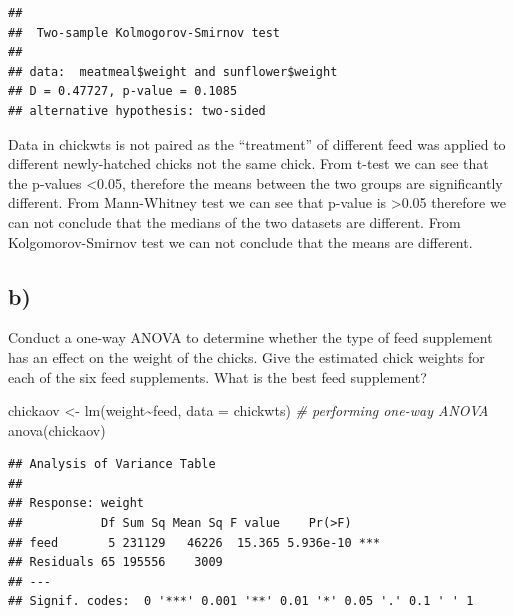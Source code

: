 \documentclass[
]{article}
\newenvironment{Shaded}{\begin{snugshade}}{\end{snugshade}}
\newcommand{\AttributeTok}[1]{\textcolor[rgb]{0.77,0.63,0.00}{#1}}
\newcommand{\CommentTok}[1]{\textcolor[rgb]{0.56,0.35,0.01}{\textit{#1}}}
\newcommand{\FunctionTok}[1]{\textcolor[rgb]{0.00,0.00,0.00}{#1}}
\newcommand{\NormalTok}[1]{#1}
\newcommand{\OtherTok}[1]{\textcolor[rgb]{0.56,0.35,0.01}{#1}}
\newcommand{\SpecialCharTok}[1]{\textcolor[rgb]{0.00,0.00,0.00}{#1}}
\newcommand{\StringTok}[1]{\textcolor[rgb]{0.31,0.60,0.02}{#1}}
\begin{document}
\begin{verbatim}
## 
##  Two-sample Kolmogorov-Smirnov test
## 
## data:  meatmeal$weight and sunflower$weight
## D = 0.47727, p-value = 0.1085
## alternative hypothesis: two-sided
\end{verbatim}

Data in chickwts is not paired as the ``treatment'' of different feed
was applied to different newly-hatched chicks not the same chick. From
t-test we can see that the p-values \textless0.05, therefore the means
between the two groups are significantly different. From Mann-Whitney
test we can see that p-value is \textgreater0.05 therefore we can not
conclude that the medians of the two datasets are different. From
Kolgomorov-Smirnov test we can not conclude that the means are
different.

\hypertarget{b-3}{%
\subsection{b)}\label{b-3}}

Conduct a one-way ANOVA to determine whether the type of feed supplement
has an effect on the weight of the chicks. Give the estimated chick
weights for each of the six feed supplements. What is the best feed
supplement?

\begin{Shaded}
\begin{Highlighting}[]
\NormalTok{chickaov }\OtherTok{\textless{}{-}} \FunctionTok{lm}\NormalTok{(weight}\SpecialCharTok{\textasciitilde{}}\NormalTok{feed, }\AttributeTok{data =}\NormalTok{ chickwts)}
\CommentTok{\# performing one{-}way ANOVA}
\FunctionTok{anova}\NormalTok{(chickaov)}
\end{Highlighting}
\end{Shaded}

\begin{verbatim}
## Analysis of Variance Table
## 
## Response: weight
##           Df Sum Sq Mean Sq F value    Pr(>F)    
## feed       5 231129   46226  15.365 5.936e-10 ***
## Residuals 65 195556    3009                      
## ---
## Signif. codes:  0 '***' 0.001 '**' 0.01 '*' 0.05 '.' 0.1 ' ' 1
\end{verbatim}

\begin{Shaded}
\end{Shaded}
\end{document}
